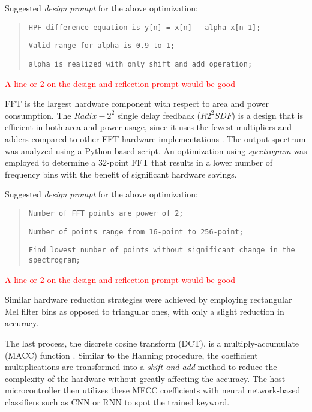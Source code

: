 Suggested \textit{design prompt} for the above optimization:
\begin{quote}
\texttt{HPF difference equation is y[n] = x[n] - alpha x[n-1];}

\texttt{Valid range for alpha is 0.9 to 1;}

\texttt{alpha is realized with only shift and add operation;}
\end{quote}

\textcolor{red}{A line or 2 on the design and reflection prompt would be good}

FFT is the largest hardware component with respect to area and power consumption. The $Radix-2^2$ single delay feedback ($R2^2SDF$) is a design that is efficient in both area and power usage, since it uses the fewest multipliers and adders compared to other FFT hardware implementations \cite{chong20220}. The output spectrum was analyzed using a Python based script. An optimization using \textit{spectrogram} was employed to determine a 32-point FFT that results in a lower number of frequency bins with the benefit of significant hardware savings.

Suggested \textit{design prompt} for the above optimization:
\begin{quote}
\texttt{Number of FFT points are power of 2;}

\texttt{Number of points range from 16-point to 256-point;}

\texttt{Find lowest number of points without significant change in the spectrogram;}
\end{quote}

\textcolor{red}{A line or 2 on the design and reflection prompt would be good}


Similar hardware reduction strategies were achieved by employing rectangular Mel filter bins as opposed to triangular ones, with only a slight reduction in accuracy. 

The last process, the discrete cosine transform (DCT), is a multiply-accumulate (MACC) function \cite{chong20220}. Similar to the Hanning procedure, the coefficient multiplications are transformed into a \textit{shift-and-add} method to reduce the complexity of the hardware without greatly affecting the accuracy.
 The host microcontroller then utilizes these MFCC coefficients with neural network-based classifiers such as CNN or RNN to spot the trained keyword.


